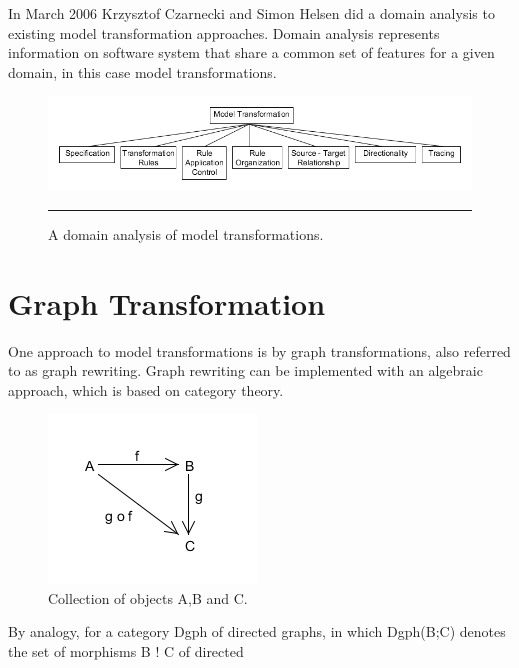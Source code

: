 In March 2006 Krzysztof Czarnecki and Simon Helsen did a domain analysis to
existing model transformation approaches. Domain analysis represents
information on software system that share a common set of features for a given
domain\cite{FODA,Prieto-Diaz1990}, in this case model transformations.

\begin{figure}[H]
  \centering
    \includegraphics[scale=0.6]{./Figures/Model_Transformation_Survey.png}
    \rule{35em}{0.5pt}
  \caption[Domain Analysis of Model Transformations]
  				{A domain analysis of model transformations\cite{Czarnecki2006}.}
  \label{fig:Model_Transformation_Survey}
\end{figure}


\section{Graph Transformation} 
One approach to model transformations is by graph transformations,
also referred to as graph rewriting. Graph rewriting can be implemented with
an algebraic approach, which is based on category theory\cite{Barr1990}.

\begin{figure}[H]
	\centering
	\includegraphics[scale=0.7]{./Figures/categoryTheory.png}
	\caption[Category Theory]{Collection of objects A,B and C.}
	\label{fig:categoryTheory}
\end{figure}

By analogy, for a category Dgph of directed graphs, in which Dgph(B;C) denotes the
set of morphisms B ! C of directed

